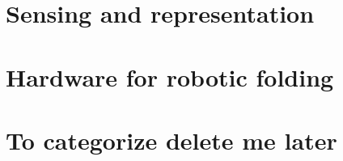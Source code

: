 \documentclass[\home/main.tex]{subfiles}
\begin{document}
\section{Sensing and representation} \label{sec:towards_sensing_representation}


\section{Hardware for robotic folding}

\section{To categorize delete me later}

\printbibliography
\end{document}
